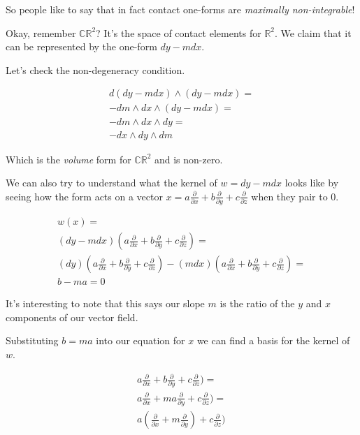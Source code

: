 \documentclass{article}
\begin{document}
So people like to say that in fact contact one-forms are \textit{maximally non-integrable}!

Okay, remember $\mathbb{CR}^{2}$? It's the space of contact elements for
$\mathbb{R}^2$. We claim that it can be represented by the one-form $dy - mdx$.

Let's check the non-degeneracy condition.

\begin{align*}
  d (dy - mdx) \wedge (dy - mdx) = \\
  -dm \wedge dx \wedge (dy - mdx) = \\
  -dm \wedge dx \wedge dy = \\
  -dx \wedge dy \wedge dm
\end{align*}

Which is the \textit{volume} form for $\mathbb{CR}^{2}$ and is non-zero.

We can also try to understand what the kernel of $w = dy - mdx$ looks like by seeing
how the form acts on a vector $x = a\frac{\partial}{\partial x} +
b\frac{\partial}{\partial y} + c\frac{\partial}{\partial z}$ when they pair to 0.

\begin{align*}
  w (x) = \\
  (dy - mdx) (a\frac{\partial}{\partial x} +
  b\frac{\partial}{\partial y} + c\frac{\partial}{\partial z}) = \\
  (dy)(a\frac{\partial}{\partial x} +
b\frac{\partial}{\partial y} + c\frac{\partial}{\partial z}) - (mdx)(a\frac{\partial}{\partial x} +
b\frac{\partial}{\partial y} + c\frac{\partial}{\partial z}) = \\
  b - ma = 0
\end{align*}

It's interesting to note that this says our slope $m$ is the ratio of the $y$
and $x$ components of our vector field.

Substituting $b = ma$ into our equation for $x$ we can find a basis for the
kernel of $w$.

\begin{align*}
  a\frac{\partial}{\partial x} +
    b\frac{\partial}{\partial y} + c\frac{\partial}{\partial z}) = \\
  a\frac{\partial}{\partial x} +
    ma\frac{\partial}{\partial y} + c\frac{\partial}{\partial z}) = \\
  a(\frac{\partial}{\partial x} +
    m\frac{\partial}{\partial y}) + c\frac{\partial}{\partial z}) 
\end{align*}
\end{document}
